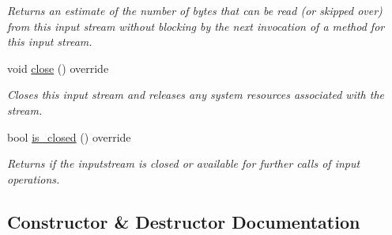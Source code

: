 \begin{DoxyCompactItemize}
\begin{DoxyCompactList}\small\item\em Returns an estimate of the number of bytes that can be read (or skipped over) from this input stream without blocking by the next invocation of a method for this input stream. \end{DoxyCompactList}\item 
void \hyperlink{structdevfix_1_1base_1_1io_1_1source_aa00a381c8a166cbbc5dbf6de4b56590e}{close} () override
\begin{DoxyCompactList}\small\item\em Closes this input stream and releases any system resources associated with the stream. \end{DoxyCompactList}\item 
bool \hyperlink{structdevfix_1_1base_1_1io_1_1source_a406834cf6651d48949b96d0ef49cc6c1}{is\+\_\+closed} () override
\begin{DoxyCompactList}\small\item\em Returns if the {\itshape inputstream} is closed or available for further calls of input operations. \end{DoxyCompactList}\end{DoxyCompactItemize}


\subsection{Constructor \& Destructor Documentation}
\mbox{\label{structdevfix_1_1base_1_1io_1_1source_af8bef20f5b54153c3fd1fbc7daa263c5}} 
